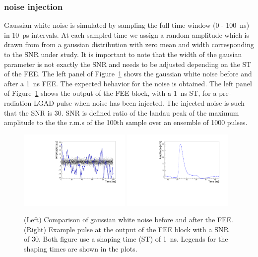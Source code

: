 \documentclass[preprint,1p]{elsarticle}
\begin{document}
\subsubsection{noise injection}\label{sec:noise_simulation}
Gaussian white noise is simulated by sampling the full time window (0 - 100~\si{ns}) in 10~\si{ps} intervals. At each
sampled time we assign a random amplitude which is drawn from from a gaussian distribution with zero mean and width corresponding to the SNR
under study. It is important to note that the width of the gausian parameter is not exactly the SNR and needs to be adjusted depending
on the ST of the FEE. The left panel of Figure~\ref{fig:noise} shows the gaussian white noise before and after a 1~\si{ns} FEE.
The expected behavior for the noise is obtained. The left panel of Figure~\ref{fig:noise} shows the output of the FEE block, with a 1~\si{ns} ST,
 for a pre-radiation LGAD pulse when noise has been injected. The injected noise is such that the SNR is 30. SNR is defined ratio of the landau peak of the maximum amplitude
 to the the r.m.s of the 100th sample over  an ensemble of 1000 pulses.

\begin{figure}[htbp]
  \centering
  \includegraphics[width=0.48\textwidth]{figs/noise_vs_shaped_noise.pdf} \hfill
  \includegraphics[width=0.48\textwidth]{figs/lgad_pre_rad_st_1ns_snr_30.pdf}
  \caption{(Left) Comparison of gaussian white noise before and after the FEE.
  (Right) Example pulse at the output of the FEE block with a SNR of 30. Both figure use a shaping time (ST) of 1~\si{ns}. Legends for the shaping times are shown in the plots.}
  \label{fig:noise}
\end{figure}
\end{document}
